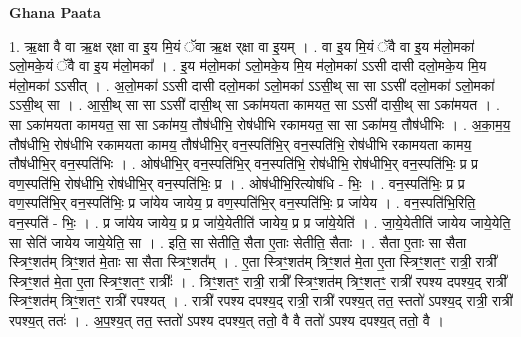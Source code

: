 \documentclass[17pt]{extarticle}
\begin{document}
\textbf{Ghana Paata } \newline

1. ऋ॒क्षा वै वा ऋ॒क्ष र्‌क्षा वा इ॒य मि॒यं ॅवा ऋ॒क्ष र्‌क्षा वा इ॒यम् । . वा इ॒य मि॒यं ॅवै वा इ॒य म॑लो॒मका॑ ऽलो॒मके॒यं ॅवै वा इ॒य म॑लो॒मका᳚ । . इ॒य म॑लो॒मका॑ ऽलो॒मके॒य मि॒य म॑लो॒मका॑ ऽऽसी दासी दलो॒मके॒य मि॒य म॑लो॒मका॑ ऽऽसीत् । . अ॒लो॒मका॑ ऽऽसी दासी दलो॒मका॑ ऽलो॒मका॑ ऽऽसी॒थ् सा सा ऽऽसी॑ दलो॒मका॑ ऽलो॒मका॑ ऽऽसी॒थ् सा । . आ॒सी॒थ् सा सा ऽऽसी॑ दासी॒थ् सा ऽका॑मयता कामयत॒ सा ऽऽसी॑ दासी॒थ् सा ऽका॑मयत । . सा ऽका॑मयता कामयत॒ सा सा ऽका॑मय॒ तौष॑धीभि॒ रोष॑धीभि रकामयत॒ सा सा ऽका॑मय॒ तौष॑धीभिः । . अ॒का॒म॒य॒ तौष॑धीभि॒ रोष॑धीभि रकामयता कामय॒ तौष॑धीभि॒र् वन॒स्पति॑भि॒र् वन॒स्पति॑भि॒ रोष॑धीभि रकामयता कामय॒ तौष॑धीभि॒र् वन॒स्पति॑भिः । . ओष॑धीभि॒र् वन॒स्पति॑भि॒र् वन॒स्पति॑भि॒ रोष॑धीभि॒ रोष॑धीभि॒र् वन॒स्पति॑भिः॒ प्र प्र वण॒स्पति॑भि॒ रोष॑धीभि॒ रोष॑धीभि॒र् वन॒स्पति॑भिः॒ प्र । . ओष॑धीभि॒रित्योष॑धि - भिः॒ । . वन॒स्पति॑भिः॒ प्र प्र वण॒स्पति॑भि॒र् वन॒स्पति॑भिः॒ प्र जा॑येय जायेय॒ प्र वण॒स्पति॑भि॒र् वन॒स्पति॑भिः॒ प्र जा॑येय । . वन॒स्पति॑भि॒रिति॒ वन॒स्पति॑ - भिः॒ । . प्र जा॑येय जायेय॒ प्र प्र जा॑ये॒येतीति॑ जायेय॒ प्र प्र जा॑ये॒येति॑ । . जा॒ये॒येतीति॑ जायेय जाये॒येति॒ सा सेति॑ जायेय जाये॒येति॒ सा । . इति॒ सा सेतीति॒ सैता ए॒ताः सेतीति॒ सैताः । . सैता ए॒ताः सा सैता स्त्रिꣳ॒॒शत॑म् त्रिꣳ॒॒शत॑ मे॒ताः सा सैता स्त्रिꣳ॒॒शत᳚म् । . ए॒ता स्त्रिꣳ॒॒शत॑म् त्रिꣳ॒॒शत॑ मे॒ता ए॒ता स्त्रिꣳ॒॒शतꣳ॒॒ रात्री॒ रात्री᳚ स्त्रिꣳ॒॒शत॑ मे॒ता ए॒ता स्त्रिꣳ॒॒शतꣳ॒॒ रात्रीः᳚ । . त्रिꣳ॒॒शतꣳ॒॒ रात्री॒ रात्री᳚ स्त्रिꣳ॒॒शत॑म् त्रिꣳ॒॒शतꣳ॒॒ रात्री॑ रपश्य दपश्य॒द् रात्री᳚ स्त्रिꣳ॒॒शत॑म् त्रिꣳ॒॒शतꣳ॒॒ रात्री॑ रपश्यत् । . रात्री॑ रपश्य दपश्य॒द् रात्री॒ रात्री॑ रपश्य॒त् तत॒ स्ततो॑ ऽपश्य॒द् रात्री॒ रात्री॑ रपश्य॒त् ततः॑ । . अ॒प॒श्य॒त् तत॒ स्ततो॑ ऽपश्य दपश्य॒त् ततो॒ वै वै ततो॑ ऽपश्य दपश्य॒त् ततो॒ वै । \newline
\end{document}
